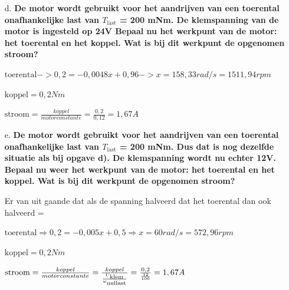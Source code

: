\begin{enumerate}
\item [d.] \textbf{De motor wordt gebruikt voor het aandrijven van een toerental onafhankelijke
    last van $T_{\text{last}}$ = 200 mNm. De klemspanning van de motor is ingesteld op 24V
    Bepaal nu het werkpunt van de motor: het toerental en het koppel. Wat is bij dit werkpunt de opgenomen stroom?}     

        $\text{toerental} -> 0,2=-0,0048x + 0,96 -> x = 158,33 rad/s = 1511,94 rpm $
    
        $\text{koppel} = 0,2 Nm$
        
        $\text{stroom} = \frac{koppel}{motorconstante} = \frac{0,2}{0,12} = 1,67 A$

    \item [e.] \textbf{De motor wordt gebruikt voor het aandrijven van een toerental onafhankelijke
    last van $T_{\text{last}}$ = 200 mNm. Dus dat is nog dezelfde situatie als bij opgave d).
    De klemspanning wordt nu echter 12V.
    Bepaal nu weer het werkpunt van de motor: het toerental en het koppel.
    Wat is bij dit werkpunt de opgenomen stroom?}

    Er van uit gaande dat als de spanning halveerd dat het toerental dan ook halveerd =

    $\text{toerental} \Rightarrow 0,2=-0,005x + 0,5 \Rightarrow x = 60 rad/s = 572,96 rpm  $

    $\text{koppel} = 0,2 Nm$
    
    $\text{stroom} 
    = \frac{koppel}{motorconstante} 
    = \frac{koppel}{\frac{U\textsubscript{klem}}{\omega\textsubscript{nullast}}}
    = \frac{0,2}{\frac{12}{100}} = 1,67 A$

\end{enumerate}
